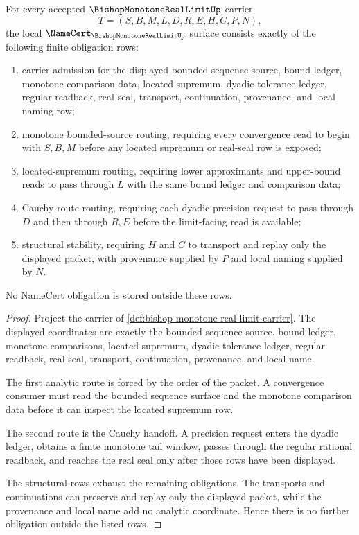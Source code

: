 \begin{theorem}
\label{thm:bishop-monotone-real-limit-namecert-obligations}
For every accepted $\BishopMonotoneRealLimitUp$ carrier
$$
T=(S,B,M,L,D,R,E,H,C,P,N),
$$
the local $\NameCert_{\BishopMonotoneRealLimitUp}$ surface consists exactly of the following finite obligation rows:
\begin{enumerate}
\item carrier admission for the displayed bounded sequence source, bound ledger, monotone comparison data, located supremum, dyadic tolerance ledger, regular readback, real seal, transport, continuation, provenance, and local naming row;
\item monotone bounded-source routing, requiring every convergence read to begin with $S,B,M$ before any located supremum or real-seal row is exposed;
\item located-supremum routing, requiring lower approximants and upper-bound reads to pass through $L$ with the same bound ledger and comparison data;
\item Cauchy-route routing, requiring each dyadic precision request to pass through $D$ and then through $R,E$ before the limit-facing read is available;
\item structural stability, requiring $H$ and $C$ to transport and replay only the displayed packet, with provenance supplied by $P$ and local naming supplied by $N$.
\end{enumerate}
No NameCert obligation is stored outside these rows.
\end{theorem}
\begin{proof}
Project the carrier of \autoref{def:bishop-monotone-real-limit-carrier}. The displayed coordinates are exactly the bounded sequence source, bound ledger, monotone comparisons, located supremum, dyadic tolerance ledger, regular readback, real seal, transport, continuation, provenance, and local name.

The first analytic route is forced by the order of the packet. A convergence consumer must read the bounded sequence surface and the monotone comparison data before it can inspect the located supremum row.

The second route is the Cauchy handoff. A precision request enters the dyadic ledger, obtains a finite monotone tail window, passes through the regular rational readback, and reaches the real seal only after those rows have been displayed.

The structural rows exhaust the remaining obligations. The transports and continuations can preserve and replay only the displayed packet, while the provenance and local name add no analytic coordinate. Hence there is no further obligation outside the listed rows.
\end{proof}

